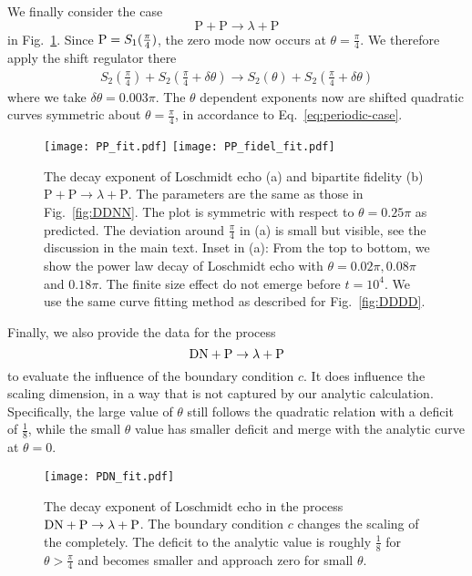 We finally consider the case
\begin{equation}
\text{P}+\text{P}\rightarrow\lambda+\text{P}
\end{equation}
in Fig.~\ref{fig:PPPP}. Since ${\rm P} = S_1( \frac{\pi}{4} ) $, the zero mode now occurs at $\theta = \frac{\pi}{4}$. We therefore apply the shift regulator there 
\begin{equation}
\begin{aligned}
\label{eq:approx_DNDN}
S_2\left(\frac{\pi}{4}\right)+S_2\left(\frac{\pi}{4}+\delta\theta\right)\rightarrow S_2(\theta)+S_2\left(\frac{\pi}{4}+\delta\theta\right)
\end{aligned}
\end{equation}
where we take $\delta\theta=0.003\pi$. The $\theta$ dependent exponents now are shifted quadratic curves symmetric about $ \theta = \frac{\pi}{4}$, in accordance to Eq.~\eqref{eq:periodic-case}.

\begin{figure}
  \centering
  \texttt{[image: PP\_fit.pdf]}
    \texttt{[image: PP\_fidel\_fit.pdf]}
    \caption{The decay exponent of Loschmidt echo (a) and bipartite fidelity (b) $\text{P}+\text{P}\rightarrow\lambda+\text{P}$. The parameters are the same as those in Fig.~\ref{fig:DDNN}. The plot is symmetric with respect to $\theta=0.25\pi$ as predicted. The deviation around $\frac{\pi}{4}$ in (a) is small but visible, see the discussion in the main text. Inset in (a): From the top to bottom, we show the power law decay of Loschmidt echo with $\theta=0.02\pi, 0.08\pi $ and $0.18\pi$. The finite size effect do not emerge before $t=10^{4}$. We use the same curve fitting method as described for Fig.~\ref{fig:DDDD}.}
    \label{fig:PPPP}
\end{figure}

Finally, we also provide the data for the process
\begin{equation}
{\rm DN} + {\rm P} \rightarrow \lambda  + {\rm P}
\end{equation}
to evaluate the influence of the boundary condition $c$. It {\rm does} influence the scaling dimension, in a way that is not captured by our analytic calculation. Specifically, the large value of $\theta$ still follows the quadratic relation with a deficit of $\frac{1}{8}$, while the small $\theta$ value has smaller deficit and merge with the analytic curve at $\theta = 0$. 
\begin{figure}[htb]
\centering
\texttt{[image: PDN\_fit.pdf]}
\caption{The decay exponent of Loschmidt echo in the process ${\rm DN} + {\rm P} \rightarrow \lambda  + {\rm P}$. The boundary condition $c$ changes the scaling of the completely. The deficit to the analytic value is roughly $\frac{1}{8}$ for $\theta > \frac{\pi}{4}$ and becomes smaller and approach zero for small $\theta$. }
\label{fig:PDN_fit}
\end{figure}



